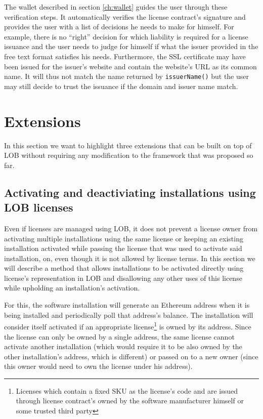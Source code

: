 \documentclass[a4paper]{article}
\begin{document}
The wallet described in section \ref{ch:wallet} guides the user through these verification steps. It automatically verifies the license contract's signature and provides the user with a list of decisions he needs to make for himself. For example, there is no “right” decision for which liability is required for a license issuance and the user needs to judge for himself if what the issuer provided in the free text format satisfies his needs. Furthermore, the SSL certificate may have been issued for the issuer's website and contain the website's URL as its common name. It will thus not match the name returned by \texttt{issuerName()} but the user may still decide to trust the issuance if the domain and issuer name match.



\section{Extensions}
\label{ch:extensions}

In this section we want to highlight three extensions that can be built on top of LOB without requiring any modification to the framework that was proposed so far.

\subsection{Activating and deactiviating installations using LOB licenses}
\label{ch:installationActivation}

Even if licenses are managed using LOB, it does not prevent a license owner from activating multiple installations using the same license or keeping an existing installation activated while passing the license that was used to activate said installation, on, even though it is not allowed by license terms. In this section we will describe a method that allows installations to be activated directly using license's representation in LOB and disallowing any other uses of this license while upholding an installation's activation.

For this, the software installation will generate an Ethereum address when it is being installed and periodically poll that address's balance. The installation will consider itself activated if an appropriate license\footnote{Licenses which contain a fixed SKU as the license's code and are issued through license contract's owned by the software manufacturer himself or some trusted third party} is owned by its address. Since the license can only be owned by a single address, the same license cannot activate another installation (which would require it to be also owned by the other installation's address, which is different) or passed on to a new owner (since this owner would need to own the license under his address).
\end{document}
